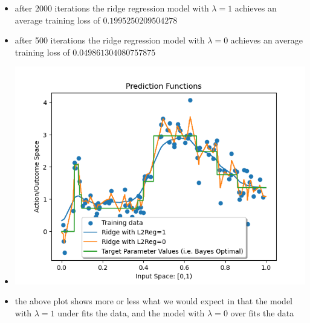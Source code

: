 \documentclass{article}
\theoremstyle{plain}
\theoremstyle{definition}
\begin{document}
\begin{enumerate}
\begin{itemize}
    \color{blue}
    \item after 2000 iterations the ridge regression model with $\lambda=1$ achieves an average training loss of $\mathbf{0.1995250209504278}$
    \item after 500 iterations the ridge regression model with $\lambda =0$ achieves an average training loss of $\mathbf{0.049861304080757875}$ 
    \item \includegraphics[width = 15cm]{homework_code/hw7/immages/hw_7_3.png}
    \item the above plot shows more or less what we would expect in that the model with $\lambda=1$ under fits the data, and the model with $\lambda =0$ over fits the data 
\end{itemize}

\setcounter{saveenum}{\value{enumi}}
\end{enumerate}
\end{document}
